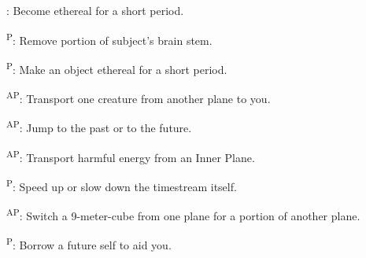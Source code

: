 \begin{enumerate*}
      : Become ethereal for a short period.

\item {}\textsuperscript{P}: Remove portion of subject's brain stem.

      \textsuperscript{P}: Make an object ethereal for a short period.

      \textsuperscript{AP}: Transport one creature from another plane to you.

      \textsuperscript{AP}: Jump to the past or to the future.

\item {}\textsuperscript{AP}: Transport harmful energy from an Inner Plane.

      \textsuperscript{P}: Speed up or slow down the timestream itself.

\item {}\textsuperscript{AP}: Switch a 9-meter-cube from one plane for a portion of another plane.

      \textsuperscript{P}: Borrow a future self to aid you.
\end{enumerate*}



